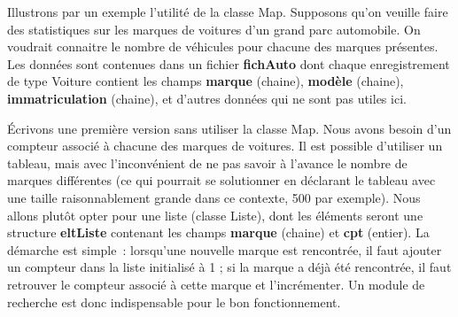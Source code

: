 	Illustrons par un exemple l'utilité de la classe Map. Supposons qu'on
	veuille faire des statistiques sur les marques de voitures d'un grand 
	parc automobile. On voudrait connaitre le nombre de véhicules pour 
	chacune des marques présentes. Les données sont contenues dans un fichier 
	\textbf{fichAuto} dont chaque enregistrement de type Voiture contient 
	les champs \textbf{marque} (chaine), \textbf{modèle} (chaine),
	\textbf{immatriculation} (chaine), et d'autres données qui ne sont 
	pas utiles ici.
	
	Écrivons une première version sans utiliser la classe Map. 
	Nous avons besoin d'un compteur associé à chacune des marques de voitures. 
	Il est possible d'utiliser un tableau, mais avec l'inconvénient de ne 
	pas savoir à l'avance le nombre de marques différentes
	(ce qui pourrait se solutionner en déclarant le tableau avec une 
	taille raisonnablement grande dans ce contexte, 500 par exemple). 
	Nous allons plutôt opter pour une liste (classe Liste), 
	dont les éléments seront une structure \textbf{eltListe} 
	contenant les champs \textbf{marque} (chaine) et \textbf{cpt} (entier). 
	La démarche est simple~:
	lorsqu'une nouvelle marque est rencontrée, il faut ajouter un compteur 
	dans la liste initialisé à 1 ; si la marque a déjà été rencontrée, 
	il faut retrouver le compteur associé à cette marque et l'incrémenter. 
	Un module de recherche est donc indispensable pour le bon fonctionnement.

	
